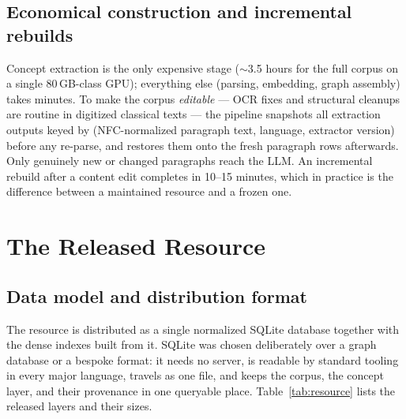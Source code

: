 \documentclass[pdflatex,sn-mathphys-num]{sn-jnl}
\begin{document}
\subsection{Economical construction and incremental rebuilds}
\label{sec:build}

Concept extraction is the only expensive stage ($\sim$3.5 hours for the
full corpus on a single 80\,GB-class GPU); everything else (parsing,
embedding, graph assembly) takes minutes. To make the corpus
\emph{editable} --- OCR fixes and structural cleanups are routine in
digitized classical texts --- the pipeline snapshots all extraction
outputs keyed by (NFC-normalized paragraph text, language, extractor
version) before any re-parse, and restores them onto the fresh paragraph
rows afterwards. Only genuinely new or changed paragraphs reach the LLM.
An incremental rebuild after a content edit completes in 10--15 minutes,
which in practice is the difference between a maintained resource and a
frozen one.

\section{The Released Resource}
\label{sec:resource}

\subsection{Data model and distribution format}

The resource is distributed as a single normalized SQLite database
together with the dense indexes built from it. SQLite was chosen
deliberately over a graph database or a bespoke format: it needs no
server, is readable by standard tooling in every major language, travels
as one file, and keeps the corpus, the concept layer, and their
provenance in one queryable place. Table~\ref{tab:resource} lists the
released layers and their sizes.
\end{document}
